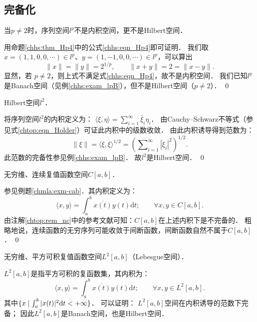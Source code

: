 \subsection{完备化}


\begin{example}
	当$p \neq 2$时，序列空间$l^{p}$不是内积空间，更不是Hilbert空间．
\end{example}
用命题\ref{chhs:thm_Hp4}中的公式\eqref{chhs:eqn_Hp4}即可证明．
我们取$x=(1,1,0,0, \cdots) \in l^{p}$、$y=(1,-1,0,0, \cdots) \in l^{p}$，可以算出
$$
\|x\|=\|y\|={2}^{1/p}, \qquad \|x+y\|=2=\|x-y\|.
$$
显然，若 $p \neq 2$，则上式不满足式\eqref{chhs:eqn_Hp4}，故不是内积空间．
我们已知$l^{p}$是Banach空间（见例\ref{chhs:exam_lpB}），但不是Hilbert空间（$p\neq 2$）．
\qed


\begin{example}
	Hilbert空间$l^2$．
\end{example}
将序列空间$l^{2}$的内积定义为：
$\langle \xi, \eta\rangle=\sum\nolimits_{i=1}^{\infty} \bar{\xi}_{i} \eta_{i}$．
由Cauchy--Schwarz不等式（参见式\eqref{chtop:eqn_Holder}）可证此内积中的级数收敛．
由此内积诱导得到范数为：
\begin{equation}
	\|\xi\|=\langle \xi, \xi \rangle^{1 / 2}
	=\left(\sum\nolimits_{i=1}^{\infty}\left|\xi_{i}\right|^{2}\right)^{1 / 2} .
\end{equation}
此范数的完备性参见例\ref{chhs:exam_lpB}．
故$l^2$是Hilbert空间．
\qed

\begin{example}
	无穷维、连续复值函数空间$C[a,b]$．
\end{example}
参见例题\ref{chmla:exm-cab}．其内积定义为：
\begin{equation}\label{chhs:eqn_InCab}
	\langle x, y\rangle=\int_{a}^{b} \overline{x(t)} y(t)  \mathrm{d} t ;
	\qquad \forall x, y \in C[a, b].
\end{equation}
由注解\ref{chtop:rem_nc}中的参考文献可知：$C[a,b]$在上述内积下是不完备的．
粗略地说，连续函数的无穷序列可能收敛于间断函数，间断函数自然不属于$C[a,b]$．
\qed


\begin{example}
	无穷维、平方可积复值函数空间$L^2[a,b]$（Lebesgue空间）．
\end{example}
$L^2[a,b]$是指平方可积的复函数集，其内积为：
\begin{equation}\label{chhs:eqn_InLab}
	\langle x, y\rangle=\int_{a}^{b} \overline{x(t)} y(t)  \mathrm{d} t ;
	\qquad \forall x, y \in L^2[a, b].
\end{equation}
其中$\{x\mid \int_a^b |x(t)|^2{\rm d}t<+\infty\}$．
可以证明\cite[例 1.4.11]{zhang-lin-2021}：
$L^2[a,b]$空间在内积诱导的范数下完备；
因此$L^2[a,b]$是Banach空间，也是Hilbert空间．



